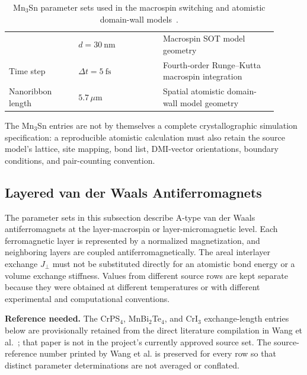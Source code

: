 \begin{table}[htbp]
\begin{tabular}{p{0.23\linewidth}p{0.29\linewidth}p{0.38\linewidth}}
                 & $d=30\ \mathrm{nm}$
                 & Macrospin SOT model geometry                                                   \\
        Time step
                 & $\Delta t=5\ \mathrm{fs}$
                 & Fourth-order Runge--Kutta macrospin integration                                \\
        Nanoribbon length
                 & $5.7\,\mu\mathrm{m}$
                 & Spatial atomistic domain-wall model geometry                                   \\
        \hline
    \end{tabular}
    \caption{Mn$_3$Sn parameter sets used in the macrospin switching and
        atomistic domain-wall models~\cite{xu2024mn3sn,xu2025mn3sn-domain-wall}.}
    \label{tab:mn3sn-parameters}
\end{table}

The Mn$_3$Sn entries are not by themselves a complete crystallographic
simulation specification: a reproducible atomistic calculation must also retain
the source model's lattice, site mapping, bond list, DMI-vector orientations,
boundary conditions, and pair-counting convention.

\subsection{Layered van der Waals Antiferromagnets}

The parameter sets in this subsection describe A-type van der Waals
antiferromagnets at the layer-macrospin or layer-micromagnetic level.  Each
ferromagnetic layer is represented by a normalized magnetization, and
neighboring layers are coupled antiferromagnetically.  The areal interlayer
exchange $J_\perp$ must not be substituted directly for an atomistic bond
energy or a volume exchange stiffness.  Values from different source rows are
kept separate because they were obtained at different temperatures or with
different experimental and computational conventions.

\textbf{Reference needed.}  The CrPS$_4$, MnBi$_2$Te$_4$, and CrI$_3$
exchange-length entries below are provisionally retained from the direct
literature compilation in Wang et al.~\cite{wang2026stoner-afm}; that paper is
not in the project's currently approved source set.  The source-reference
number printed by Wang et al. is preserved for every row so that distinct
parameter determinations are not averaged or conflated.

